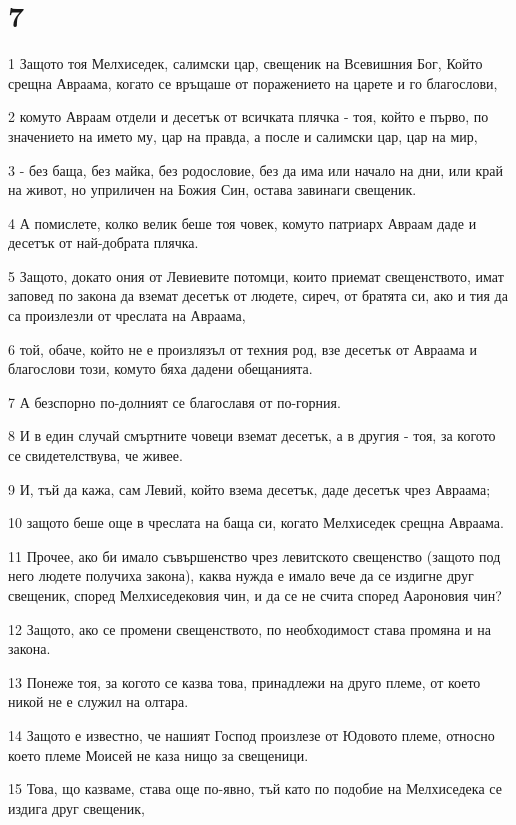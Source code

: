 \chapter{7}

\par 1 Защото тоя Мелхиседек, салимски цар, свещеник на Всевишния Бог, Който срещна Авраама, когато се връщаше от поражението на царете и го благослови,
\par 2 комуто Авраам отдели и десетък от всичката плячка - тоя, който е първо, по значението на името му, цар на правда, а после и салимски цар, цар на мир,
\par 3 - без баща, без майка, без родословие, без да има или начало на дни, или край на живот, но уприличен на Божия Син, остава завинаги свещеник.
\par 4 А помислете, колко велик беше тоя човек, комуто патриарх Авраам даде и десетък от най-добрата плячка.
\par 5 Защото, докато ония от Левиевите потомци, които приемат свещенството, имат заповед по закона да вземат десетък от людете, сиреч, от братята си, ако и тия да са произлезли от чреслата на Авраама,
\par 6 той, обаче, който не е произлязъл от техния род, взе десетък от Авраама и благослови този, комуто бяха дадени обещанията.
\par 7 А безспорно по-долният се благославя от по-горния.
\par 8 И в един случай смъртните човеци вземат десетък, а в другия - тоя, за когото се свидетелствува, че живее.
\par 9 И, тъй да кажа, сам Левий, който взема десетък, даде десетък чрез Авраама;
\par 10 защото беше още в чреслата на баща си, когато Мелхиседек срещна Авраама.
\par 11 Прочее, ако би имало съвършенство чрез левитското свещенство (защото под него людете получиха закона), каква нужда е имало вече да се издигне друг свещеник, според Мелхиседековия чин, и да се не счита според Аароновия чин?
\par 12 Защото, ако се промени свещенството, по необходимост става промяна и на закона.
\par 13 Понеже тоя, за когото се казва това, принадлежи на друго племе, от което никой не е служил на олтара.
\par 14 Защото е известно, че нашият Господ произлезе от Юдовото племе, относно което племе Моисей не каза нищо за свещеници.
\par 15 Това, що казваме, става още по-явно, тъй като по подобие на Мелхиседека се издига друг свещеник,
